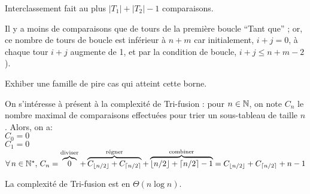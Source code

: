 		\begin{Propriete}
			Interclassement fait au plus \( |T_1| + |T_2| - 1 \) comparaisons.
		\end{Propriete}
	
		\begin{Preuve}
			Il y a moins de comparaisons que de tours de la première boucle ``Tant que'' ; or, ce nombre de tours de boucle est inférieur à \( n + m \) car initialement, \( i + j = 0 \), à chaque tour \( i + j \) augmente de 1, et par la condition de boucle, \( i + j \leq n + m - 2 \)).
		\end{Preuve}
	
		\begin{Exercice}
			Exhiber une famille de pire cas qui atteint cette borne.
		\end{Exercice}
		
		On s'intéresse à présent à la complexité de \textsf{Tri-fusion} : pour \(n\in\mathbb{N}\), on note \(C_n\) le nombre maximal de comparaisons effectuées pour trier un sous-tableau de taille \(n\). Alors, on a: \\
			 \bdot $C_0 = 0$ \\
			 \bdot $C_1 = 0$ \\[-4.5mm]
			 \bdot $\forall \, n \in \mathbb{N}^*,\, C_n = \overbrace{0}^{\text{diviser}} + \overbrace{C_{\lfloor n/2 \rfloor} + C_{\lceil n/2 \rceil}}^{\text{régner}} + \overbrace{\lfloor n/2 \rfloor + \lceil n/2 \rceil - 1}^{\text{combiner}} = C_{\lfloor n/2 \rfloor} + C_{\lceil n/2 \rceil} + n - 1$
			
		\begin{Propriete}
			La complexité de \textsf{Tri-fusion} est en \( \Theta (n \log n) \).
		\end{Propriete}
		
